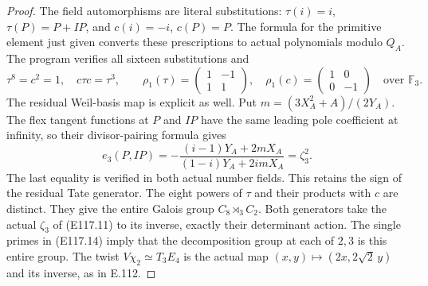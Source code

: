 \begin{proof}
The field automorphisms are literal substitutions:
$\tau(i)=i$, $\tau(P)=P+IP$, and $c(i)=-i$, $c(P)=P$.
The formula for the primitive element just given converts
these prescriptions to actual polynomials modulo $Q_A$.
The program verifies all sixteen substitutions and
\[
 \tau^8=c^2=1,\quad c\tau c=\tau^3,\qquad
 \rho_1(\tau)=\begin{pmatrix}1&-1\\1&1\end{pmatrix},
 \quad\rho_1(c)=\begin{pmatrix}1&0\\0&-1\end{pmatrix}
 \quad\text{over }\mathbb F_3.
 \tag{E117.15}
\]
The residual Weil-basis map is explicit as well.  Put
$m=(3X_A^2+A)/(2Y_A)$.  The flex tangent functions at $P$
and $IP$ have the same leading pole coefficient at infinity,
so their divisor-pairing formula gives
\[
 e_3(P,IP)=-\frac{(i-1)Y_A+2mX_A}{(1-i)Y_A+2imX_A}
              =\zeta_3^2.
 \tag{E117.16}
\]
The last equality is verified in both actual number fields.
This retains the sign of the residual Tate generator.
The eight powers of $\tau$ and their products with $c$ are
distinct.  They give the entire Galois group
$C_8\rtimes_{3}C_2$.  Both generators take the actual
$\zeta_3$ of (E117.11) to its inverse, exactly their determinant
action.  The single primes in (E117.14) imply that the
decomposition group at each of $2,3$ is this entire group.
The twist $V\chi_2\simeq T_3E_4$ is the actual map
$(x,y)\mapsto(2x,2\sqrt2\,y)$ and its inverse, as in E.112.


\end{proof}
